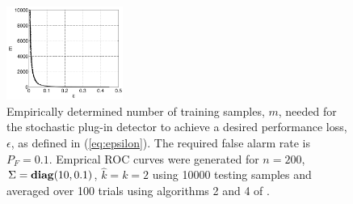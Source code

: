 \begin{figure}[t]
\centering
\includegraphics[width=1.5in]{figures/epsilon_graph.pdf}
\vspace{-0.1in}
\caption{Empirically determined number of training samples, $m$,  needed for the stochastic plug-in detector to achieve a desired performance loss, $\epsilon$, as defined in (\ref{eq:epsilon}). The required false alarm rate is $P_F=0.1$. Emprical ROC curves were generated for $n=200$, $\Sigma=\mathop{\bf diag}(10,0.1)$, $\widehat{k}=k=2$ using 10000 testing samples and averaged over 100 trials using algorithms 2 and 4 of \cite{fawcett2006introduction}.}
\label{fig:epsilon_graph}
\vspace{-0.3in}
\end{figure}

